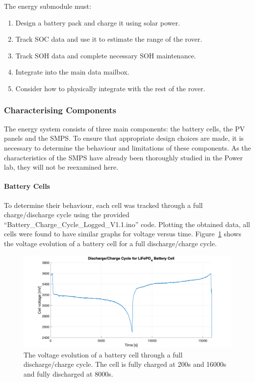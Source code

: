 \documentclass[a4paper]{article}
\begin{document}
\vspace{-10pt}
The energy submodule must:
\begin{enumerate}
    \item Design a battery pack and charge it using solar power.
    \item Track SOC data and use it to estimate the range of the rover.
    \item Track SOH data and complete necessary SOH maintenance.
    \item Integrate into the main data mailbox.
    \item Consider how to physically integrate with the rest of the rover.
\end{enumerate}

\subsubsection{Characterising Components}
The energy system consists of three main components: the battery cells, the 
PV panels and the SMPS. To ensure that appropriate design choices are made, 
it is necessary to determine the behaviour and limitations of these components.
As the characteristics of the SMPS have already been thoroughly studied in
the Power lab\cite{powerLogbook}, they will not be reexamined here.

\paragraph*{Battery Cells}
To determine their behaviour, each cell was tracked through a full charge/discharge 
cycle using the provided “Battery\_Charge\_Cycle\_Logged\_V1.1.ino” 
code\cite{chargeCode}. Plotting the obtained data, all cells were found to 
have similar graphs for voltage versus time. Figure~\ref{fig:charge_cycle} 
shows the voltage evolution of a battery cell for a full discharge/charge cycle.

\begin{figure}[H]
    \centering
    \includegraphics[scale=0.22]{Charge_Cycle2.png}
    \caption{The voltage evolution of a battery cell through a full discharge/charge cycle. The
    cell is fully charged at 200s and 16000s and fully discharged at 8000s.}
    \label{fig:charge_cycle}
\end{figure}
\end{document}
